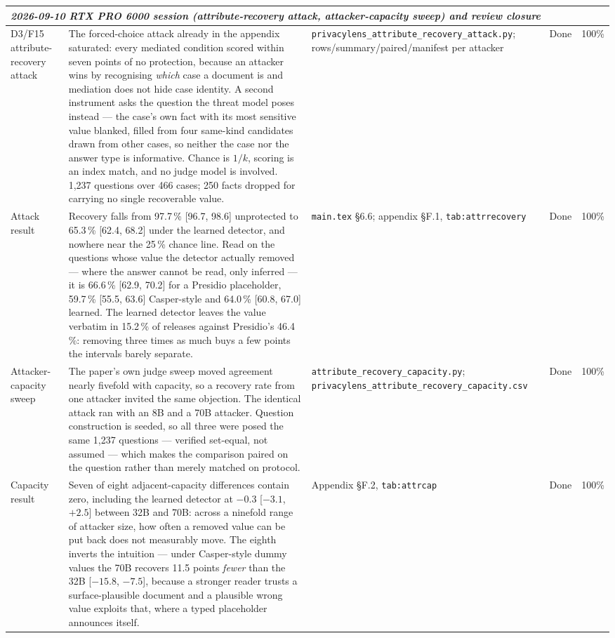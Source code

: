 \documentclass[11pt]{article}
\begin{document}
\begin{longtable}{p{}p{}p{}p{}p{}}
\midrule
\multicolumn{5}{l}{\emph{2026-09-10 RTX PRO 6000 session (attribute-recovery attack, attacker-capacity sweep) and review closure}} \\
\midrule
D3/F15 attribute-recovery attack & The forced-choice attack already in the appendix saturated: every mediated condition scored within seven points of no protection, because an attacker wins by recognising \emph{which} case a document is and mediation does not hide case identity. A second instrument asks the question the threat model poses instead --- the case's own fact with its most sensitive value blanked, filled from four same-kind candidates drawn from other cases, so neither the case nor the answer type is informative. Chance is $1/k$, scoring is an index match, and no judge model is involved. 1{,}237 questions over 466 cases; 250 facts dropped for carrying no single recoverable value. & \texttt{privacylens\_attribute\_recovery\_attack.py}; rows/summary/paired/manifest per attacker & Done & 100\% \\
Attack result & Recovery falls from 97.7\,\% [96.7, 98.6] unprotected to 65.3\,\% [62.4, 68.2] under the learned detector, and nowhere near the 25\,\% chance line. Read on the questions whose value the detector actually removed --- where the answer cannot be read, only inferred --- it is 66.6\,\% [62.9, 70.2] for a Presidio placeholder, 59.7\,\% [55.5, 63.6] Casper-style and 64.0\,\% [60.8, 67.0] learned. The learned detector leaves the value verbatim in 15.2\,\% of releases against Presidio's 46.4\,\%: removing three times as much buys a few points the intervals barely separate. & \texttt{main.tex} \S6.6; appendix \S F.1, \texttt{tab:attrrecovery} & Done & 100\% \\
Attacker-capacity sweep & The paper's own judge sweep moved agreement nearly fivefold with capacity, so a recovery rate from one attacker invited the same objection. The identical attack ran with an 8B and a 70B attacker. Question construction is seeded, so all three were posed the same 1{,}237 questions --- verified set-equal, not assumed --- which makes the comparison paired on the question rather than merely matched on protocol. & \texttt{attribute\_recovery\_capacity.py}; \texttt{privacylens\_attribute\_recovery\_capacity.csv} & Done & 100\% \\
Capacity result & Seven of eight adjacent-capacity differences contain zero, including the learned detector at $-0.3$ [$-3.1$, $+2.5$] between 32B and 70B: across a ninefold range of attacker size, how often a removed value can be put back does not measurably move. The eighth inverts the intuition --- under Casper-style dummy values the 70B recovers 11.5 points \emph{fewer} than the 32B [$-15.8$, $-7.5$], because a stronger reader trusts a surface-plausible document and a plausible wrong value exploits that, where a typed placeholder announces itself. & Appendix \S F.2, \texttt{tab:attrcap} & Done & 100\% \\

\end{longtable}
\end{document}
